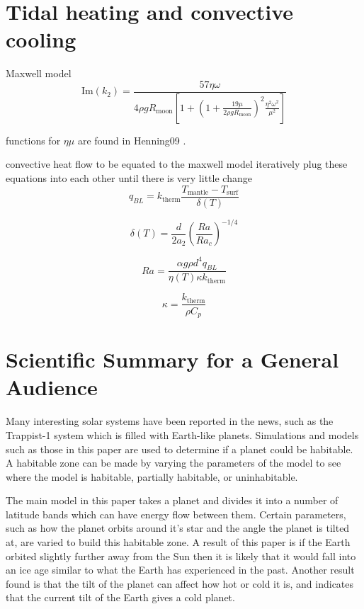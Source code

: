 \documentclass[12pt, onecolumn]{revtex4-2}    %
\begin{document}
\section{Tidal heating and convective cooling} \label{app:convcooling}

Maxwell model
\begin{equation}
    \text{Im}(k_2) = \frac{57 \eta \omega}{4 \rho g R_{\text{moon}}\left[1 + \left(1+\frac{19\mu}{2\rho g R_{\text{moon}}}\right)^2 \frac{\eta^2 \omega^2}{\mu^2}\right]}
\end{equation}

functions for $\eta \mu$ are found in Henning09 \cite{Henning2009}.

convective heat flow to be equated to the maxwell model
iteratively plug these equations into each other until there is very little change
\begin{equation}
    q_{BL} = k_{\text{therm}} \frac{T_{\text{mantle}} - T_{\text{surf}}}{\delta(T)}
\end{equation}

\begin{equation}
    \delta(T) = \frac{d}{2 a_2} \left(\frac{Ra}{Ra_c}\right)^{-1/4}
\end{equation}

\begin{equation}
    Ra = \frac{\alpha g \rho d^4 q_{BL}}{\eta(T) \kappa k_{\text{therm}}}
\end{equation}

\begin{equation}
    \kappa = \frac{k_{\text{therm}}}{\rho C_p}
\end{equation}

\clearpage

\section*{Scientific Summary for a General Audience}

Many interesting solar systems have been reported in the news, such as the Trappist-1 system which is filled with Earth-like planets.
Simulations and models such as those in this paper are used to determine if a planet could be habitable.
A habitable zone can be made by varying the parameters of the model to see where the model is habitable, partially habitable, or uninhabitable.

The main model in this paper takes a planet and divides it into a number of latitude bands which can have energy flow between them.
Certain parameters, such as how the planet orbits around it's star and the angle the planet is tilted at, are varied to build this habitable zone.
A result of this paper is if the Earth orbited slightly further away from the Sun then it is likely that it would fall into an ice age similar to what the Earth has experienced in the past.
Another result found is that the tilt of the planet can affect how hot or cold it is, and indicates that the current tilt of the Earth gives a cold planet.
\end{document}
